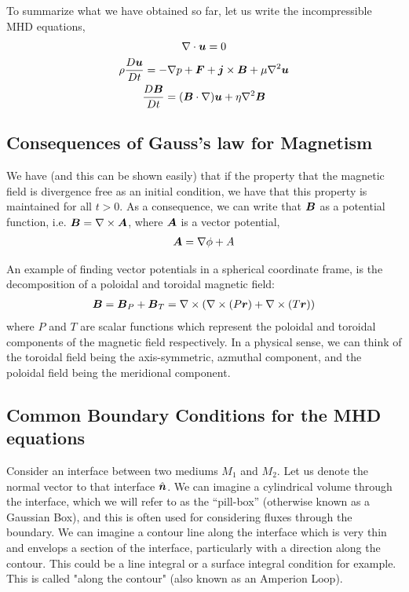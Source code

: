 \documentclass{article}
\begin{document}
To summarize what we have obtained so far, let us write the incompressible MHD
equations,
\begin{gather}
    \nabla \cdot{\boldsymbol{u}} = 0\\
    \rho\frac{D \boldsymbol{u}}{D t} = -\nabla p + \boldsymbol{F} + \boldsymbol{j}\times\boldsymbol{B} + \mu\nabla^2\boldsymbol{u}\\
    \frac{D \boldsymbol{B}}{D t} = (\boldsymbol{B}\cdot\nabla)\boldsymbol{u} + \eta\nabla^2\boldsymbol{B}
\end{gather}


\subsection{Consequences of Gauss's law for Magnetism}

We have (and this can be shown easily) that if the property that the magnetic
field is divergence free as an initial condition, we have that this property is
maintained for all $t>0$. As a consequence, we can write that $\boldsymbol{B}$ as a
potential function, i.e. $\boldsymbol{B} = \nabla\times\boldsymbol{A}$, where $\boldsymbol{A}$ is a vector
potential, 
\begin{gather*}
    \boldsymbol{A} = \nabla\phi + A
\end{gather*}

An example of finding vector potentials in a spherical coordinate frame, is the
decomposition of a poloidal and toroidal magnetic field:
\begin{gather*}
    \boldsymbol{B} = \boldsymbol{B}_P + \boldsymbol{B}_T =\nabla\times\left(\nabla\times(P\boldsymbol{r}) +
    \nabla\times(T\boldsymbol{r})\right)
\end{gather*}
where $P$ and $T$ are scalar functions which represent the poloidal and toroidal
components of the magnetic field respectively. In a physical sense, we can think
of the toroidal field being the axis-symmetric, azmuthal component, and the
poloidal field being the meridional component. 

\subsection{Common Boundary Conditions for the MHD equations}

Consider an interface between two mediums $M_1$ and $M_2$. Let us denote the
normal vector to that interface $\hat{\boldsymbol{n}}$. We can imagine a cylindrical
volume through the interface, which we will refer to as the ``pill-box''
(otherwise known as a Gaussian Box), and
this is often used for considering fluxes through the boundary. We can imagine
a contour line along the interface which is very thin and envelops a section of
the interface, particularly with a direction along the contour. This could be a
line integral or a surface integral condition for example. This is called "along
the contour" (also known as an Amperion Loop). 
\end{document}
